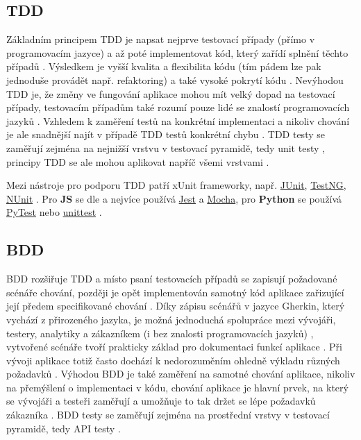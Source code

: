 \subsection{TDD}

Základním principem TDD je napsat nejprve testovací případy (přímo v programovacím jazyce) a až poté implementovat kód, který zařídí splnění těchto případů \cite{test-swtestinghelp2}. Výsledkem je vyšší kvalita a flexibilita kódu (tím pádem lze pak jednoduše provádět např. refaktoring) a také vysoké pokrytí kódu \cite{test-swtestinghelp2}. Nevýhodou TDD je, že změny ve fungování aplikace mohou mít velký dopad na testovací případy, testovacím případům také rozumí pouze lidé se znalostí programovacích jazyků \cite{test-swtestinghelp2}. Vzhledem k zaměření testů na konkrétní implementaci a nikoliv chování je ale snadnější najít v případě TDD testů konkrétní chybu  \cite{test-swtestinghelp2}. TDD testy se zaměřují zejména na nejnižší vrstvu v testovací pyramidě, tedy unit testy \cite{test-swtestinghelp1}, principy TDD se ale mohou aplikovat napříč všemi vrstvami \cite{test-dzone}.

Mezi nástroje pro podporu TDD patří xUnit frameworky, např. \href{https://junit.org/}{JUnit}, \href{https://testng.org/}{TestNG}, \href{https://nunit.org/}{NUnit} \cite{test-swtestinghelp2}. Pro \textbf{JS} se dle \cite{test-chart-js2} a \cite{test-chart-js1} nejvíce používá \href{https://jestjs.io/}{Jest} a \href{https://mochajs.org/}{Mocha}, pro \textbf{Python} se používá \href{https://docs.pytest.org/en/latest/}{PyTest} nebo \href{https://docs.python.org/3/library/unittest.html}{unittest} \cite{test-chart-python}.

\subsection{BDD}

BDD rozšiřuje TDD a místo psaní testovacích případů se zapisují požadované scénáře chování, později je opět implementován samotný kód aplikace zařizující její předem specifikované chování \cite{test-swtestinghelp2}. Díky zápisu scénářů v jazyce Gherkin, který vychází z přirozeného jazyka, je možná jednoduchá spolupráce mezi vývojáři, testery, analytiky a zákazníkem (i bez znalosti programovacích jazyků) \cite{test-swtestinghelp2, test-cucumber1}, vytvořené scénáře tvoří prakticky základ pro dokumentaci funkcí aplikace \cite{test-smartbear2}. Při vývoji aplikace totiž často dochází k nedorozuměním ohledně výkladu různých požadavků \cite{test-smartbear2}. Výhodou BDD je také zaměření na samotné chování aplikace, nikoliv na přemýšlení o implementaci v kódu, chování aplikace je hlavní prvek, na který se vývojáři a testeři zaměřují a umožňuje to tak držet se lépe požadavků zákazníka \cite{test-swtestinghelp2}. BDD testy se zaměřují zejména na prostřední vrstvy v testovací pyramidě, tedy API testy \cite{test-swtestinghelp1}.

